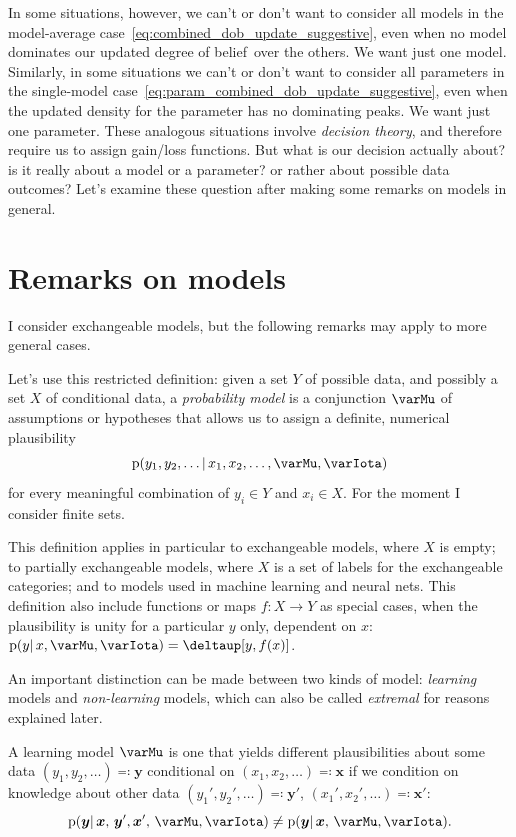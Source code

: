 \documentclass[\ifafour a4paper,12pt,\else a5paper,10pt,\fi%
onecolumn,oneside,article,%
british%
]{memoir}
\theoremstyle{remark}
\theoremstyle{innote}
\newcommand*{\delt}{\deltaup}%
\newcommand*{\defs}{\eqqcolon}
\newcommand*{\pf}{\mathrm{p}}%
\renewcommand*{\|}{\mathpunct{|}}
\newcommand*{\dob}{degree of belief}
\newcommand*{\yM}{\varMu}
\newcommand*{\yX}{X}
\newcommand*{\yY}{Y}
\newcommand*{\yx}{\bm{x}}
\newcommand*{\yy}{\bm{y}}
\newcommand*{\yI}{\varIota}
\begin{document}
\medskip

In some situations, however, we can't or don't want to consider all models
in the model-average case~\eqref{eq:combined_dob_update_suggestive}, even
when no model dominates our updated \dob\ over the others. We want just one
model. Similarly, in some situations we can't or don't want to consider all
parameters in the single-model
case~\eqref{eq:param_combined_dob_update_suggestive}, even when the updated
density for the parameter has no dominating peaks. We want just one
parameter. These analogous situations involve \emph{decision theory}, and
therefore require us to assign gain/loss functions. But what is our
decision actually about? is it really about a model or a parameter? or
rather about possible data outcomes? Let's examine these question after
making some remarks on models in general.


\section{Remarks on models}
\label{sec:tentative_def}

I consider exchangeable models, but the following remarks may apply to more
general cases.

Let's use this restricted definition: given a set $\yY$ of possible data,
and possibly a set $\yX$ of conditional data, a \emph{probability model} is
a conjunction $\yM$ of assumptions or hypotheses that allows us to assign a
definite, numerical plausibility
\begin{equation}
  \pf(y_1, y_2,\dotsc \| x_1, x_2, \dotsc, \yM, \yI)
  \label{eq:plaus}
\end{equation}
for every meaningful combination of $y_i \in \yY$ and $x_i \in \yX$. For
the moment I consider finite sets.

This definition applies in particular to exchangeable models, where $\yX$
is empty; to partially exchangeable models, where $\yX$ is a set of labels
for the exchangeable categories; and to models used in machine learning and
neural nets. This definition also include functions or maps
$f \colon \yX \to \yY$ as special cases, when the plausibility is unity for
a particular $y$ only, dependent on $x$:
$\pf(y \| x, \yM, \yI) = \delt[y, f(x)]$.

An important distinction can be made between two kinds of model:
\emph{learning} models and \emph{non-learning} models, which can also be
called \emph{extremal} for reasons explained later.

A learning model $\yM$ is one that yields different plausibilities about
some data $(y_1, y_2, \dotsc) \defs \yy$ conditional on
$(x_1, x_2, \dotsc) \defs \yx$ if we condition on knowledge about other
data $(y_1', y_2', \dotsc) \defs \yy'$, $(x_1', x_2', \dotsc) \defs \yx'$:
\begin{equation}
  \label{eq:learning_def}
  \pf(\yy  \| \yx,\, \yy', \yx',\, \yM, \yI) \ne
  \pf(\yy  \| \yx,\, \yM, \yI).
\end{equation}
\end{document}
